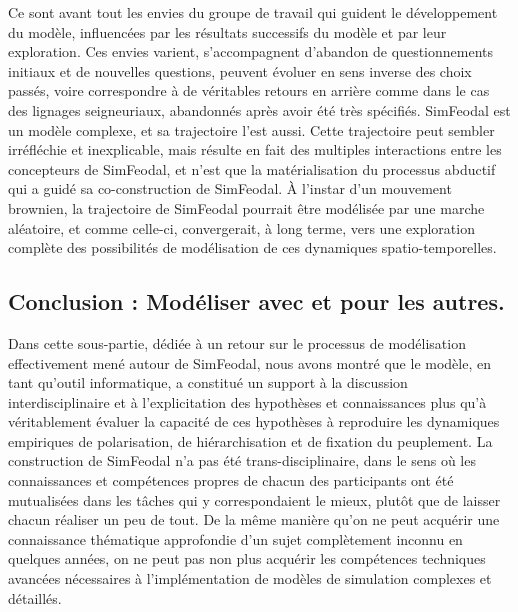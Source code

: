 Ce sont avant tout les envies du groupe de travail qui guident le développement du modèle, influencées par les résultats successifs du modèle et par leur exploration.
Ces envies varient, s'accompagnent d'abandon de questionnements initiaux et de nouvelles questions, peuvent évoluer en sens inverse des choix passés, voire correspondre à de véritables \og retours en arrière\fg{} comme dans le cas des lignages seigneuriaux, abandonnés après avoir été très spécifiés.
SimFeodal est un modèle complexe, et sa trajectoire l'est aussi.
Cette trajectoire peut sembler irréfléchie et inexplicable, mais résulte en fait des multiples interactions entre les concepteurs de SimFeodal, et n'est que la matérialisation du processus abductif qui a guidé sa co-construction de SimFeodal.
À l'instar d'un mouvement brownien, la trajectoire de SimFeodal pourrait être modélisée par une marche aléatoire, et comme celle-ci, convergerait, à long terme, vers une exploration complète des possibilités de modélisation de ces dynamiques spatio-temporelles.

\subsection{Conclusion : Modéliser avec et pour les autres.}

Dans cette sous-partie, dédiée à un retour sur le processus de modélisation effectivement mené autour de SimFeodal, nous avons montré que le modèle, en tant qu'outil informatique, a constitué un support à la discussion interdisciplinaire et à l'explicitation des hypothèses et connaissances plus qu'à véritablement évaluer la capacité de ces hypothèses à reproduire les dynamiques empiriques de polarisation, de hiérarchisation et de fixation du peuplement.
La construction de SimFeodal n'a pas été trans-disciplinaire, dans le sens où les connaissances et compétences propres de chacun des participants ont été mutualisées dans les tâches qui y correspondaient le mieux, plutôt que de laisser chacun réaliser \og un peu de tout\fg{}.
De la même manière qu'on ne peut acquérir une connaissance thématique approfondie d'un sujet complètement inconnu en quelques années, on ne peut pas non plus acquérir les compétences techniques avancées nécessaires à l'implémentation de modèles de simulation complexes et détaillés.

